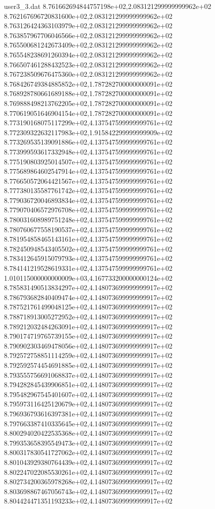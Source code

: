 \begin{filecontents}{user3_3.dat}
8.761662694844757198e+02,2.083121299999999962e+02
8.762167696720831600e+02,2.083121299999999962e+02
8.763126424363103979e+02,2.083121299999999962e+02
8.763857967706046566e+02,2.083121299999999962e+02
8.765500681242673409e+02,2.083121299999999962e+02
8.765548238691260394e+02,2.083121299999999962e+02
8.766507461288432523e+02,2.083121299999999962e+02
8.767238509676475360e+02,2.083121299999999962e+02
8.768426749384885852e+02,1.787282700000000091e+02
8.768928780661689188e+02,1.787282700000000091e+02
8.769888498213762205e+02,1.787282700000000091e+02
8.770619051646904154e+02,1.787282700000000091e+02
8.773190168075117299e+02,4.137547599999999761e+02
8.772309322632117983e+02,1.915842299999999909e+02
8.773269535139091886e+02,4.137547599999999761e+02
8.773999593617332948e+02,4.137547599999999761e+02
8.775190803925014507e+02,4.137547599999999761e+02
8.775689864602547914e+02,4.137547599999999761e+02
8.776650572064421567e+02,4.137547599999999761e+02
8.777380135587761742e+02,4.137547599999999761e+02
8.779036720046893834e+02,4.137547599999999761e+02
8.779070406572976708e+02,4.137547599999999761e+02
8.780031608989751248e+02,4.137547599999999761e+02
8.780760677558190537e+02,4.137547599999999761e+02
8.781954858465143161e+02,4.137547599999999761e+02
8.782450948543405502e+02,4.137547599999999761e+02
8.783412645915079793e+02,4.137547599999999761e+02
8.784141219528619331e+02,4.137547599999999761e+02
1.010115000000000009e+03,4.167733200000000124e+02
8.785831490513834297e+02,4.148073699999999917e+02
8.786793682840409474e+02,4.148073699999999917e+02
8.787521761499048125e+02,4.148073699999999917e+02
8.788718913005272952e+02,4.148073699999999917e+02
8.789212032484263091e+02,4.148073699999999917e+02
8.790174719765739155e+02,4.148073699999999917e+02
8.790902303469478056e+02,4.148073699999999917e+02
8.792572758851114259e+02,4.148073699999999917e+02
8.792592574454691885e+02,4.148073699999999917e+02
8.793555756691068837e+02,4.148073699999999917e+02
8.794282845439906851e+02,4.148073699999999917e+02
8.795482967545401607e+02,4.148073699999999917e+02
8.795973116425120679e+02,4.148073699999999917e+02
8.796936793616397381e+02,4.148073699999999917e+02
8.797663387410335645e+02,4.148073699999999917e+02
8.800294020422535368e+02,4.148073699999999917e+02
8.799353658395549473e+02,4.148073699999999917e+02
8.800317830541727062e+02,4.148073699999999917e+02
8.801043929380764439e+02,4.148073699999999917e+02
8.802247022085530261e+02,4.148073699999999917e+02
8.802734200365978268e+02,4.148073699999999917e+02
8.803698867467056743e+02,4.148073699999999917e+02
8.804424471351193233e+02,4.148073699999999917e+02

\end{filecontents}

